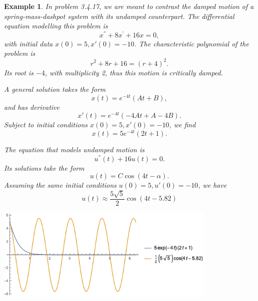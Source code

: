 \documentclass[11pt]{amsart}
\newtheorem{example}{Example}
\numberwithin{equation}{section}
\begin{document}
\begin{example}
In problem 3.4.17, we are meant to contrast the damped motion of a spring-mass-dashpot system with its undamped counterpart. The differential equation modelling this problem is
\begin{equation*}
x^{''}+8x^{'}+16x=0,
\end{equation*}
 with initial data $x(0)=5, x'(0)=-10$. The characteristic polynomial of the problem is 
\begin{equation*}
r^2+8r+16=(r+4)^2.
\end{equation*}
Its root is $-4$, with multiplicity 2, thus this motion is critically damped. 

A general 
solution takes the form 
\begin{equation*}
    x(t)=e^{-4t}(At+B), 
\end{equation*}
and has derivative
\begin{equation*}
x'(t) = e^{-4t}(-4At+A-4B).
\end{equation*}
Subject to initial conditions $x(0)=5, x'(0)=-10$, we find 
\begin{equation*}
x(t)=5e^{-4t}(2t+1).
\end{equation*}

The equation that models undamped motion is 
\begin{equation*}
u^{''}(t)+16u(t) = 0.
\end{equation*}
Its solutions take the form 
\begin{equation*}
u(t)=C\cos(4t-\alpha).
\end{equation*}
Assuming the same initial conditions $u(0)=5, u'(0)=-10$, we have 
\begin{equation*}
u(t)\approx \frac{5\sqrt{5}}{2}\cos(4t-5.82)
\end{equation*}

\begin{center}
\includegraphics[width=0.8\textwidth]{p2.png}
\end{center}

\end{example}
\end{document}
